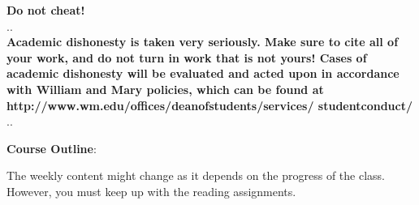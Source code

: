 \documentclass[11pt]{article}
\begin{document}
\vspace{4mm}
\textbf {\LARGE Do not cheat!} \\
.\hrulefill . \\
\textbf{Academic dishonesty is taken very seriously.  Make sure to cite all of your work, and do not turn in work that is not yours!  Cases of academic dishonesty will be evaluated and acted upon in accordance with William and Mary policies, which can be found at http://www.wm.edu/offices/deanofstudents/services/
studentconduct/} \\
.\hrulefill . \\
\vspace{8mm}

\textbf {\large Course Outline}:

The weekly content might change as it depends on the progress of the class.  However, you must keep up with the reading assignments.
\end{document}
